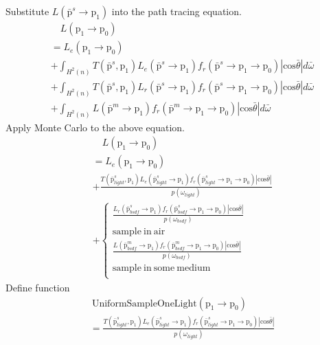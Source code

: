 \documentclass[acmtog]{acmart}
\def\w{\omega}
\def\p{\mathrm{p}}
\def\pp#1#2{\p_{#1}\rightarrow\p_{#2}}
\begin{document}
    Substitute $L(\bar{\p}^s\rightarrow\p_1)$ into the path tracing equation.
\begin{equation} \label{eq7}
\begin{split}
    &\quad L(\pp{1}{0})\\
    &= L_e(\pp{1}{0})\\
    &+ \int_{H^2(n)} T(\bar{\p}^s,\p_1)L_e(\bar{\p}^s\rightarrow\p_1) f_r(\bar{\p}^s\rightarrow\p_1\rightarrow\p_0)|\mathrm{cos}\bar{\theta}|d\bar{\w}\\
    &+ \int_{H^2(n)} T(\bar{\p}^s,\p_1)L_r(\bar{\p}^s\rightarrow\p_1) f_r(\bar{\p}^s\rightarrow\p_1\rightarrow\p_0)|\mathrm{cos}\bar{\theta}|d\bar{\w}\\
    &+ \int_{H^2(n)} L(\bar{\p}^m\rightarrow\p_1) f_r(\bar{\p}^m\rightarrow\p_1\rightarrow\p_0)|\mathrm{cos}\bar{\theta}|d\bar{\w}
\end{split}
\end{equation}
    Apply Monte Carlo to the above equation.
\begin{equation} \label{eq8}
\begin{split}
    &\quad L(\pp{1}{0})\\
    &= L_e(\pp{1}{0})\\
    &+ \frac{T(\bar{\p}^s_{light},\p_1)L_e(\bar{\p}^s_{light}\rightarrow\p_1) f_r(\bar{\p}^s_{light}\rightarrow\p_1\rightarrow\p_0)|\mathrm{cos}\bar{\theta}|}{p(\w_{light})}\\
    &+
    \left\{\begin{aligned}
        \frac{L_r(\bar{\p}^s_{bsdf}\rightarrow\p_1)f_r(\bar{\p}^s_{bsdf}\rightarrow\p_1\rightarrow\p_0)|\mathrm{cos}\bar{\theta}|}{p(\w_{bsdf})}\\
            \mathrm{sample\ in\ air}\\
        \frac{L(\bar{\p}^m_{bsdf}\rightarrow\p_1) f_r(\bar{\p}^m_{bsdf}\rightarrow\p_1\rightarrow\p_0)|\mathrm{cos}\bar{\theta}|}{p(\w_{bsdf})}\ \ \\
            \mathrm{sample\ in\ some\ medium}\\
    \end{aligned}\right.
\end{split}
\end{equation}
    Define function
\begin{equation} \label{eq9}
\begin{split}
    &\ \mathrm{UniformSampleOneLight}(\pp{1}{0})\\
    &= \frac{T(\bar{\p}^s_{light},\p_1)L_e(\bar{\p}^s_{light}\rightarrow\p_1) f_r(\bar{\p}^s_{light}\rightarrow\p_1\rightarrow\p_0)|\mathrm{cos}\bar{\theta}|}{p(\w_{light})}
\end{split}
\end{equation}
\end{document}
